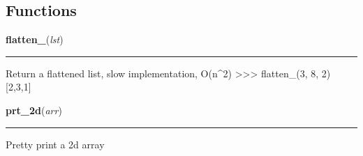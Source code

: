   \subsection{Functions}

    \label{script-avoids2_spyx:flatten_}

    \vspace{0.5ex}

\hspace{.8\funcindent}\begin{boxedminipage}{\funcwidth}

    \raggedright \textbf{flatten\_}(\textit{lst})

    \vspace{-1.5ex}

    \rule{\textwidth}{0.5\fboxrule}
\setlength{\parskip}{2ex}
    Return a flattened list, slow implementation, O(n{\textasciicircum}2) 
    {\textgreater}{\textgreater}{\textgreater} flatten\_(3, 8, 2) [2,3,1]

\setlength{\parskip}{1ex}
    \end{boxedminipage}

    \label{script-avoids2_spyx:prt_2d}

    \vspace{0.5ex}

\hspace{.8\funcindent}\begin{boxedminipage}{\funcwidth}

    \raggedright \textbf{prt\_2d}(\textit{arr})

    \vspace{-1.5ex}

    \rule{\textwidth}{0.5\fboxrule}
\setlength{\parskip}{2ex}
    Pretty print a 2d array

\setlength{\parskip}{1ex}
    \end{boxedminipage}

